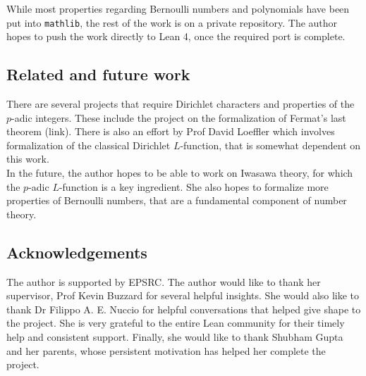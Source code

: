 \documentclass[11pt]{article}
\newcommand{\lean}[1]{\texttt{#1}\xspace} %
\begin{document}
While most properties regarding Bernoulli numbers and polynomials have been put into \lean{mathlib}, the rest of the work is on a private repository. The author hopes to push the 
work directly to Lean 4, once the required port is complete.

\subsection*{Related and future work} %
There are several projects that require Dirichlet characters and properties of the $p$-adic integers. These include the project on the formalization of Fermat's last theorem (link). 
There is also an effort by Prof David Loeffler which involves formalization of the classical Dirichlet $L$-function, that is somewhat dependent on this work. \\

In the future, the author hopes to be able to work on Iwasawa theory, for which the $p$-adic $L$-function is a key ingredient. She also hopes to formalize more properties of Bernoulli numbers, 
that are a fundamental component of number theory.

\subsection{Acknowledgements}
The author is supported by EPSRC. The author would like to thank her supervisor, Prof Kevin Buzzard for several helpful insights. 
She would also like to thank Dr Filippo A. E. Nuccio for helpful conversations that helped give shape to the project. She is very grateful 
to the entire Lean community for their timely help and consistent support. Finally, she would like to 
thank Shubham Gupta and her parents, whose persistent motivation has helped her complete the project.


\end{document}
